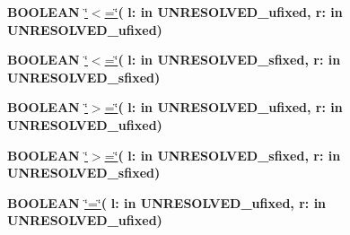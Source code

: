 \begin{DoxyCompactItemize}
\item 
{\bfseries {\bfseries \textcolor{comment}{B\+O\+O\+L\+E\+A\+N}\textcolor{vhdlchar}{ }}} \hyperlink{classfixed__pkg_ab0154e9ed0efde2e95402ec9c4433043}{\char`\"{}$<$=\char`\"{}}{\bfseries  ( }{\bfseries \textcolor{vhdlchar}{l\+: }\textcolor{stringliteral}{in }\textcolor{vhdlchar}{U\+N\+R\+E\+S\+O\+L\+V\+E\+D\+\_\+ufixed}}{\bfseries  , \textcolor{vhdlchar}{r\+: }\textcolor{stringliteral}{in }\textcolor{vhdlchar}{U\+N\+R\+E\+S\+O\+L\+V\+E\+D\+\_\+ufixed}}{\bfseries  )} 
\item 
{\bfseries {\bfseries \textcolor{comment}{B\+O\+O\+L\+E\+A\+N}\textcolor{vhdlchar}{ }}} \hyperlink{classfixed__pkg_ab0154e9ed0efde2e95402ec9c4433043}{\char`\"{}$<$=\char`\"{}}{\bfseries  ( }{\bfseries \textcolor{vhdlchar}{l\+: }\textcolor{stringliteral}{in }\textcolor{vhdlchar}{U\+N\+R\+E\+S\+O\+L\+V\+E\+D\+\_\+sfixed}}{\bfseries  , \textcolor{vhdlchar}{r\+: }\textcolor{stringliteral}{in }\textcolor{vhdlchar}{U\+N\+R\+E\+S\+O\+L\+V\+E\+D\+\_\+sfixed}}{\bfseries  )} 
\item 
{\bfseries {\bfseries \textcolor{comment}{B\+O\+O\+L\+E\+A\+N}\textcolor{vhdlchar}{ }}} \hyperlink{classfixed__pkg_ae5388d5c75013b9b70d7c00870e790fb}{\char`\"{}$>$=\char`\"{}}{\bfseries  ( }{\bfseries \textcolor{vhdlchar}{l\+: }\textcolor{stringliteral}{in }\textcolor{vhdlchar}{U\+N\+R\+E\+S\+O\+L\+V\+E\+D\+\_\+ufixed}}{\bfseries  , \textcolor{vhdlchar}{r\+: }\textcolor{stringliteral}{in }\textcolor{vhdlchar}{U\+N\+R\+E\+S\+O\+L\+V\+E\+D\+\_\+ufixed}}{\bfseries  )} 
\item 
{\bfseries {\bfseries \textcolor{comment}{B\+O\+O\+L\+E\+A\+N}\textcolor{vhdlchar}{ }}} \hyperlink{classfixed__pkg_ae5388d5c75013b9b70d7c00870e790fb}{\char`\"{}$>$=\char`\"{}}{\bfseries  ( }{\bfseries \textcolor{vhdlchar}{l\+: }\textcolor{stringliteral}{in }\textcolor{vhdlchar}{U\+N\+R\+E\+S\+O\+L\+V\+E\+D\+\_\+sfixed}}{\bfseries  , \textcolor{vhdlchar}{r\+: }\textcolor{stringliteral}{in }\textcolor{vhdlchar}{U\+N\+R\+E\+S\+O\+L\+V\+E\+D\+\_\+sfixed}}{\bfseries  )} 
\item 
{\bfseries {\bfseries \textcolor{comment}{B\+O\+O\+L\+E\+A\+N}\textcolor{vhdlchar}{ }}} \hyperlink{classfixed__pkg_a86c71a44ce23a245689eee9ff2db636a}{\char`\"{}=\char`\"{}}{\bfseries  ( }{\bfseries \textcolor{vhdlchar}{l\+: }\textcolor{stringliteral}{in }\textcolor{vhdlchar}{U\+N\+R\+E\+S\+O\+L\+V\+E\+D\+\_\+ufixed}}{\bfseries  , \textcolor{vhdlchar}{r\+: }\textcolor{stringliteral}{in }\textcolor{vhdlchar}{U\+N\+R\+E\+S\+O\+L\+V\+E\+D\+\_\+ufixed}}{\bfseries  )} 
\item 

\end{DoxyCompactItemize}
